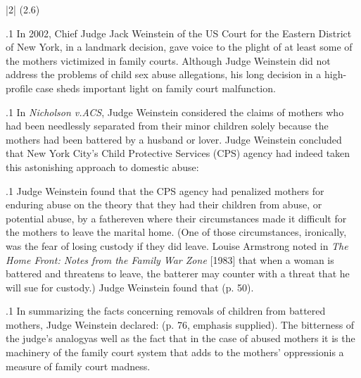 \documentclass[11pt, twoside]{article}
\begin{document}
{\s|2|{ (2.6)}

\p.1{%
\noindent{}\:In 2002, Chief Judge Jack Weinstein of the US Court for the Eastern
District of New York, in a landmark decision, gave voice to the plight of
at least some of the mothers victimized in family courts. Although Judge
Weinstein did not address the problems of child sex abuse allegations,
his long decision in a high-profile case sheds important light on family
court malfunction.\;
}%

\p.1{%
\:In \textit{Nicholson v.\@ ACS}, Judge Weinstein considered the claims of
mothers who had been needlessly separated from their minor children solely because the mothers had been battered by a husband or
lover. Judge Weinstein concluded that New York City’s Child Protective Services (CPS) agency had indeed taken this astonishing approach
to domestic abuse: \;
}%

\p.1{%
\:Judge Weinstein found that the CPS agency had penalized mothers for enduring abuse on the theory that they had 
their children from abuse, or potential abuse, by a father\mdash{}even where
their circumstances made it difficult for the mothers to leave the marital home. (One of those circumstances, ironically, was the fear of losing
custody if they did leave. Louise Armstrong noted in \textit{The Home Front: Notes
from the Family War Zone} [1983] that when a woman is battered and
threatens to leave, the batterer may counter with a threat that he will sue
for custody.) Judge Weinstein found that  (p. 50).\;
}%

\p.1{%
\:In summarizing the facts concerning removals of children from battered mothers, Judge Weinstein declared:  (p. 76, emphasis supplied). The bitterness of the judge’s analogy\mdash{}as well as the
fact that in the case of abused mothers it is the machinery of the family court system that adds to the mothers’ oppression\mdash{}is a measure of
family court madness.\;
}%


}
\end{document}
